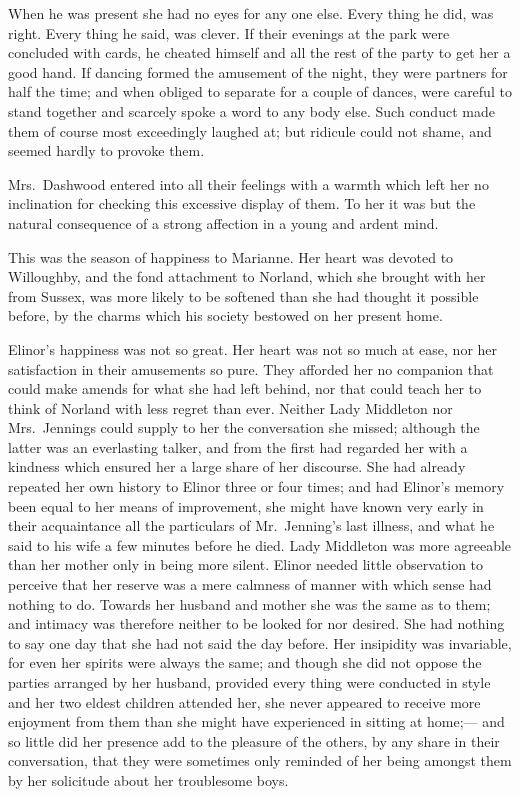 When he was present she had no eyes for any one else.
Every thing he did, was right.  Every thing he said, was clever.
If their evenings at the park were concluded with cards,
he cheated himself and all the rest of the party to get
her a good hand.  If dancing formed the amusement
of the night, they were partners for half the time;
and when obliged to separate for a couple of dances,
were careful to stand together and scarcely spoke a word
to any body else.  Such conduct made them of course
most exceedingly laughed at; but ridicule could not shame,
and seemed hardly to provoke them.

Mrs.\ Dashwood entered into all their feelings with
a warmth which left her no inclination for checking this
excessive display of them.  To her it was but the natural
consequence of a strong affection in a young and ardent mind.

This was the season of happiness to Marianne.
Her heart was devoted to Willoughby, and the fond attachment
to Norland, which she brought with her from Sussex,
was more likely to be softened than she had thought it
possible before, by the charms which his society bestowed
on her present home.

Elinor's happiness was not so great.  Her heart was not
so much at ease, nor her satisfaction in their amusements
so pure.  They afforded her no companion that could make
amends for what she had left behind, nor that could teach
her to think of Norland with less regret than ever.
Neither Lady Middleton nor Mrs.\ Jennings could supply
to her the conversation she missed; although the latter
was an everlasting talker, and from the first had regarded
her with a kindness which ensured her a large share of
her discourse.  She had already repeated her own history
to Elinor three or four times; and had Elinor's memory been
equal to her means of improvement, she might have known
very early in their acquaintance all the particulars of
Mr.\ Jenning's last illness, and what he said to his wife
a few minutes before he died.  Lady Middleton was more
agreeable than her mother only in being more silent.
Elinor needed little observation to perceive that her
reserve was a mere calmness of manner with which sense
had nothing to do.  Towards her husband and mother she
was the same as to them; and intimacy was therefore
neither to be looked for nor desired.  She had nothing
to say one day that she had not said the day before.
Her insipidity was invariable, for even her spirits were
always the same; and though she did not oppose the parties
arranged by her husband, provided every thing were conducted
in style and her two eldest children attended her,
she never appeared to receive more enjoyment from them
than she might have experienced in sitting at home;---%
and so little did her presence add to the pleasure
of the others, by any share in their conversation,
that they were sometimes only reminded of her being
amongst them by her solicitude about her troublesome boys.

